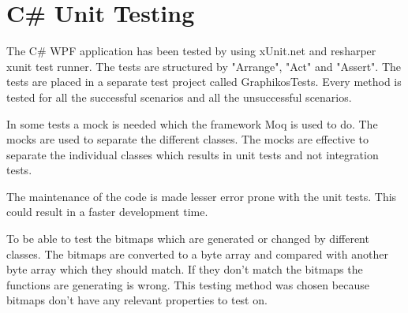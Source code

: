 \section{C\# Unit Testing}
The C\# WPF application has been tested by using xUnit.net and resharper xunit test runner. The tests are structured by "Arrange", "Act" and "Assert". The tests are placed in a separate test project called GraphikosTests. Every method is tested for all the successful scenarios and all the unsuccessful scenarios.

In some tests a mock is needed which the framework Moq is used to do. The mocks are used to separate the different classes. The mocks are effective to separate the individual classes which results in unit tests and not integration tests.

The maintenance of the code is made lesser error prone with the unit tests. This could result in a faster development time.

To be able to test the bitmaps which are generated or changed by different classes. The bitmaps are converted to a byte array and compared with another byte array which they should match. If they don’t match the bitmaps the functions are generating is wrong. This testing method was chosen because bitmaps don’t have any relevant properties to test on.